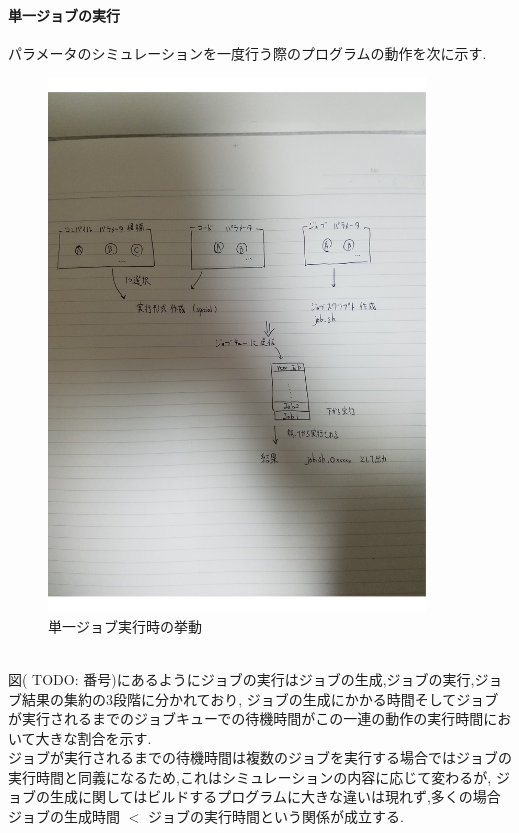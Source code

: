 \paragraph{単一ジョブの実行}
パラメータのシミュレーションを一度行う際のプログラムの動作を次に示す.\\
\begin{figure}[htb]
  \begin{center}
    \includegraphics[width=10.0cm]{./images/singlejob}
    \caption{単一ジョブ実行時の挙動}
    \label{fig:singlejob}
  \end{center}
\end{figure}
\\
図( TODO: 番号)にあるようにジョブの実行はジョブの生成,ジョブの実行,ジョブ結果の集約の3段階に分かれており,
ジョブの生成にかかる時間そしてジョブが実行されるまでのジョブキューでの待機時間がこの一連の動作の実行時間において大きな割合を示す.\\
ジョブが実行されるまでの待機時間は複数のジョブを実行する場合ではジョブの実行時間と同義になるため,これはシミュレーションの内容に応じて変わるが,
ジョブの生成に関してはビルドするプログラムに大きな違いは現れず,多くの場合ジョブの生成時間 $<$ ジョブの実行時間という関係が成立する.\\

